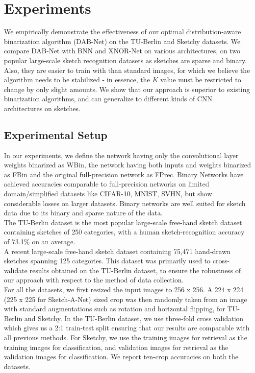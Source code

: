\section{Experiments}
\noindent We empirically demonstrate the effectiveness of our optimal distribution-aware binarization algorithm (DAB-Net) on the TU-Berlin and Sketchy datasets. We compare DAB-Net with BNN and XNOR-Net \cite{rastegari2016xnor} on various architectures, on two popular large-scale sketch recognition datasets as sketches are sparse and binary. Also, they are easier to train with than standard images, for which we believe the algorithm needs to be stabilized - in essence, the $K$ value must be restricted to change by only slight amounts. We show that our approach is superior to existing binarization algorithms, and can generalize to different kinds of CNN architectures on sketches.

\subsection{Experimental Setup}
\noindent In our experiments, we define the network having only the convolutional layer weights binarized as WBin, the network having both inputs and weights binarized as FBin and the original full-precision network as FPrec. Binary Networks have achieved accuracies comparable to  full-precision networks on limited domain/simplified  datasets like CIFAR-10, MNIST, SVHN, but show considerable losses on larger datasets. Binary networks are well suited for sketch data due to its binary and sparse nature of the data. \\

 The TU-Berlin \cite{eitz2012hdhso} dataset is the most popular large-scale free-hand sketch dataset containing sketches of 250 categories, with a human sketch-recognition accuracy of 73.1\% on an average.\\

 A recent large-scale free-hand sketch dataset containing 75,471 hand-drawn sketches spanning 125 categories. This dataset was primarily used to cross-validate results obtained on the TU-Berlin dataset, to ensure the robustness of our approach with respect to the method of data collection.\\

\noindent For all the datasets, we first resized the input images to 256 x 256. A 224 x 224 (225 x 225 for Sketch-A-Net) sized crop was then randomly taken from an image with standard augmentations such as rotation and horizontal flipping, for TU-Berlin and Sketchy. In the TU-Berlin dataset, we use three-fold cross validation which gives us a 2:1 train-test split ensuring that our results are comparable with all previous methods. For Sketchy, we use the training images for retrieval as the training images for classification, and validation images for retrieval as the validation images for classification. We report ten-crop accuracies on both the datasets.\\

